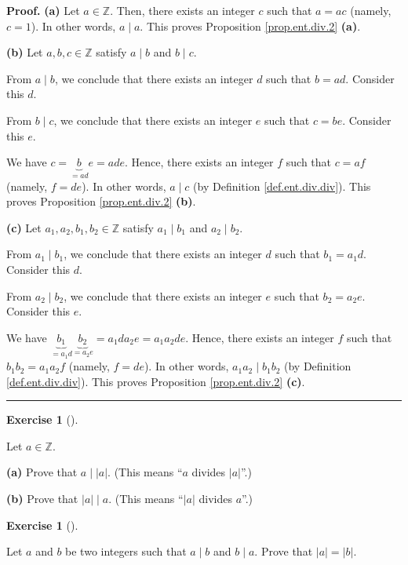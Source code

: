 \documentclass[numbers=enddot,12pt,final,onecolumn,notitlepage]{scrartcl}%
\newcounter{exer}
\numberwithin{exer}{subsection}
\theoremstyle{definition}
\newtheorem{exmp}[exer]{Exercise}
\newenvironment{exercise}[1][]
{\begin{exmp}[#1]\begin{leftbar}}
{\end{leftbar}\end{exmp}}
\newenvironment{proof}[1][Proof]{\noindent\textbf{#1.} }{\ \rule{0.5em}{0.5em}}
\begin{document}
\begin{proof}
\textbf{(a)} Let $a\in\mathbb{Z}$. Then, there exists an integer $c$ such that
$a=ac$ (namely, $c=1$). In other words, $a\mid a$. This proves Proposition
\ref{prop.ent.div.2} \textbf{(a)}.

\textbf{(b)} Let $a,b,c\in\mathbb{Z}$ satisfy $a\mid b$ and $b\mid c$.

From $a\mid b$, we conclude that there exists an integer $d$ such that $b=ad$.
Consider this $d$.

From $b\mid c$, we conclude that there exists an integer $e$ such that $c=be$.
Consider this $e$.

We have $c=\underbrace{b}_{=ad}e=ade$. Hence, there exists an integer $f$ such
that $c=af$ (namely, $f=de$). In other words, $a\mid c$ (by Definition
\ref{def.ent.div.div}). This proves Proposition \ref{prop.ent.div.2}
\textbf{(b)}.

\textbf{(c)} Let $a_{1},a_{2},b_{1},b_{2}\in\mathbb{Z}$ satisfy $a_{1}\mid
b_{1}$ and $a_{2}\mid b_{2}$.

From $a_{1}\mid b_{1}$, we conclude that there exists an integer $d$ such that
$b_{1}=a_{1}d$. Consider this $d$.

From $a_{2}\mid b_{2}$, we conclude that there exists an integer $e$ such that
$b_{2}=a_{2}e$. Consider this $e$.

We have $\underbrace{b_{1}}_{=a_{1}d}\underbrace{b_{2}}_{=a_{2}e}=a_{1}%
da_{2}e=a_{1}a_{2}de$. Hence, there exists an integer $f$ such that
$b_{1}b_{2}=a_{1}a_{2}f$ (namely, $f=de$). In other words, $a_{1}a_{2}\mid
b_{1}b_{2}$ (by Definition \ref{def.ent.div.div}). This proves Proposition
\ref{prop.ent.div.2} \textbf{(c)}.
\end{proof}

\begin{exercise}
\label{exe.ent.div.aabs}Let $a\in\mathbb{Z}$.

\textbf{(a)} Prove that $a\mid\left\vert a\right\vert $. (This means
\textquotedblleft$a$ divides $\left\vert a\right\vert $\textquotedblright.)

\textbf{(b)} Prove that $\left\vert a\right\vert \mid a$. (This means
\textquotedblleft$\left\vert a\right\vert $ divides $a$\textquotedblright.)
\end{exercise}

\begin{exercise}
\label{exe.ent.div.abba}Let $a$ and $b$ be two integers such that $a\mid b$
and $b\mid a$. Prove that $\left\vert a\right\vert =\left\vert b\right\vert $.
\end{exercise}
\end{document}
